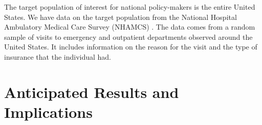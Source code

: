 \documentclass{article}
\begin{document}
The target population of interest for national policy-makers is the entire United States.  We have data on the target population from the National Hospital Ambulatory Medical Care Survey (NHAMCS) \cite{NHAMCS}.  The data comes from a random sample of visits to emergency and outpatient departments observed around the United States.  It includes information on the reason for the visit and the type of insurance that the individual had.

\section{Anticipated Results and Implications}




\end{document}
